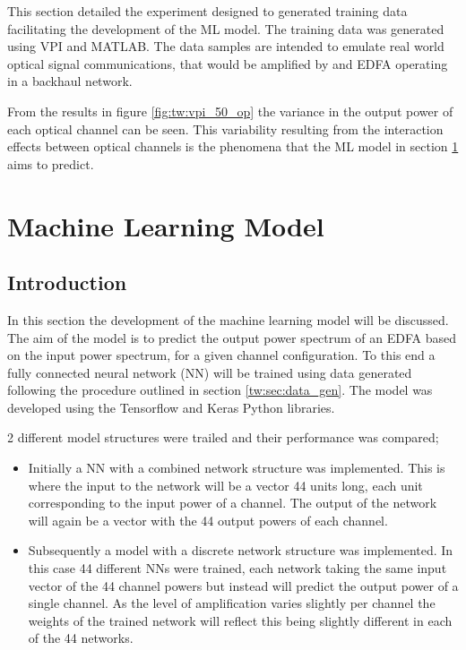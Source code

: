 This section detailed the experiment designed to generated training data facilitating the development of the ML model. The training data was generated using VPI and MATLAB. The data samples are intended to emulate real world optical signal communications, that would be amplified by and EDFA operating in a backhaul network. 

From the results in figure \ref{fig:tw:vpi_50_op} the variance in the output power of each optical channel can be seen. This variability resulting from the interaction effects between optical channels is the phenomena that the ML model in section \ref{sec:ml_model} aims to predict.  





\section{Machine Learning Model}\label{sec:ml_model}


\subsection{Introduction}
In this section the development of the machine learning model will be discussed. The aim of the model is to predict the output power spectrum of an EDFA based on the input power spectrum, for a given channel configuration. To this end a fully connected neural network (NN) will be trained using data generated following the procedure outlined in section \ref{tw:sec:data_gen}. The model was developed using the Tensorflow and Keras Python libraries.

2 different model structures were trailed and their performance was compared; 
\begin{itemize}
    \item Initially a NN with a combined network structure was implemented. This is where the input to the network will be a vector 44 units long, each unit corresponding to the input power of a channel. The output of the network will again be a vector with the 44 output powers of each channel.

    \item Subsequently a model with a discrete network structure was implemented. In this case 44 different NNs were trained, each network taking the same input vector of the 44 channel powers but instead will predict the output power of a single channel. As the level of amplification varies slightly per channel the weights of the trained network will reflect this being slightly different in each of the 44 networks.
\end{itemize}    

